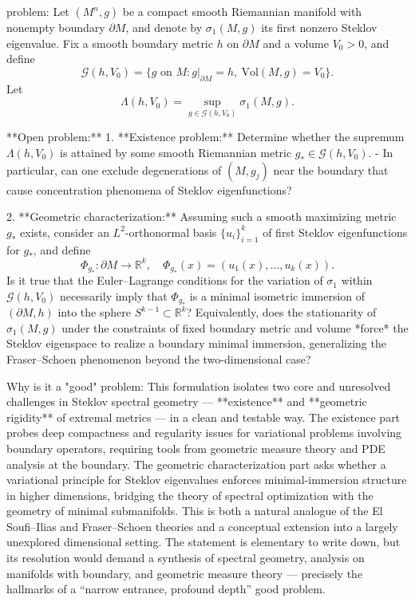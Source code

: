 problem:  
Let \( (M^n,g) \) be a compact smooth Riemannian manifold with nonempty boundary \( \partial M \), and denote by \(\sigma_1(M,g)\) its first nonzero Steklov eigenvalue.  
Fix a smooth boundary metric \(h\) on \( \partial M \) and a volume \(V_0 > 0\), and define  
\[
\mathcal{G}(h,V_0) = \{ g \text{ on } M : g|_{\partial M} = h,~\mathrm{Vol}(M,g)=V_0 \}.
\]
Let
\[
\Lambda(h,V_0) = \sup_{g \in \mathcal{G}(h,V_0)} \sigma_1(M,g).
\]

**Open problem:**  
1. **Existence problem:** Determine whether the supremum \( \Lambda(h,V_0) \) is attained by some smooth Riemannian metric \( g_* \in \mathcal{G}(h,V_0) \).  
    - In particular, can one exclude degenerations of \( (M,g_j) \) near the boundary that cause concentration phenomena of Steklov eigenfunctions?  

2. **Geometric characterization:** Assuming such a smooth maximizing metric \( g_* \) exists, consider an \(L^2\)-orthonormal basis \( \{u_i\}_{i=1}^k \) of first Steklov eigenfunctions for \(g_*\), and define
\[
\Phi_{g_*} : \partial M \to \mathbb{R}^k, \quad \Phi_{g_*}(x) = (u_1(x),\ldots,u_k(x)).
\]
Is it true that the Euler–Lagrange conditions for the variation of \( \sigma_1 \) within \( \mathcal{G}(h,V_0) \) necessarily imply that \( \Phi_{g_*} \) is a minimal isometric immersion of \((\partial M,h)\) into the sphere \(S^{k-1} \subset \mathbb{R}^k\)?  
Equivalently, does the stationarity of \( \sigma_1(M,g) \) under the constraints of fixed boundary metric and volume *force* the Steklov eigenspace to realize a boundary minimal immersion, generalizing the Fraser–Schoen phenomenon beyond the two-dimensional case?

Why is it a "good" problem:  
This formulation isolates two core and unresolved challenges in Steklov spectral geometry — **existence** and **geometric rigidity** of extremal metrics — in a clean and testable way. The existence part probes deep compactness and regularity issues for variational problems involving boundary operators, requiring tools from geometric measure theory and PDE analysis at the boundary. The geometric characterization part asks whether a variational principle for Steklov eigenvalues enforces minimal-immersion structure in higher dimensions, bridging the theory of spectral optimization with the geometry of minimal submanifolds. This is both a natural analogue of the El Soufi–Ilias and Fraser–Schoen theories and a conceptual extension into a largely unexplored dimensional setting. The statement is elementary to write down, but its resolution would demand a synthesis of spectral geometry, analysis on manifolds with boundary, and geometric measure theory — precisely the hallmarks of a “narrow entrance, profound depth” good problem.